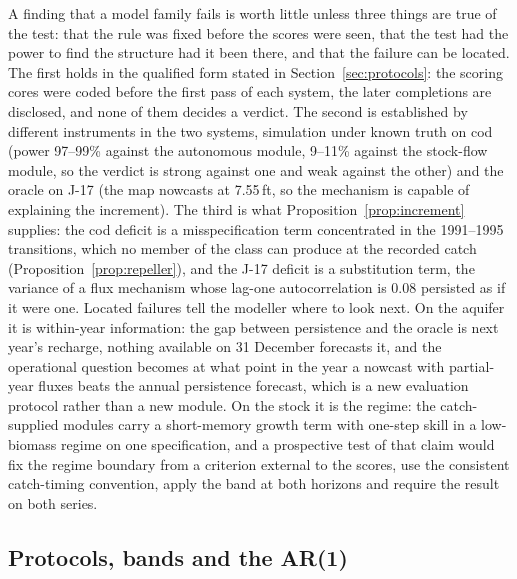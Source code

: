 \documentclass[preprint,11pt,authoryear]{elsarticle}
\theoremstyle{definition}
\theoremstyle{remark}
\begin{document}
A finding that a model family fails is worth little unless three things are true of the test: that the rule was fixed before the scores were seen, that the test had the power to find the structure had it been there, and that the failure can be located. The first holds in the qualified form stated in Section~\ref{sec:protocols}: the scoring cores were coded before the first pass of each system, the later completions are disclosed, and none of them decides a verdict. The second is established by different instruments in the two systems, simulation under known truth on cod (power 97--99\% against the autonomous module, 9--11\% against the stock-flow module, so the verdict is strong against one and weak against the other) and the oracle on J-17 (the map nowcasts at 7.55\,ft, so the mechanism is capable of explaining the increment). The third is what Proposition~\ref{prop:increment} supplies: the cod deficit is a misspecification term concentrated in the 1991--1995 transitions, which no member of the class can produce at the recorded catch (Proposition~\ref{prop:repeller}), and the J-17 deficit is a substitution term, the variance of a flux mechanism whose lag-one autocorrelation is 0.08 persisted as if it were one. Located failures tell the modeller where to look next. On the aquifer it is within-year information: the gap between persistence and the oracle is next year's recharge, nothing available on 31 December forecasts it, and the operational question becomes at what point in the year a nowcast with partial-year fluxes beats the annual persistence forecast, which is a new evaluation protocol rather than a new module. On the stock it is the regime: the catch-supplied modules carry a short-memory growth term with one-step skill in a low-biomass regime on one specification, and a prospective test of that claim would fix the regime boundary from a criterion external to the scores, use the consistent catch-timing convention, apply the band at both horizons and require the result on both series.

\subsection{Protocols, bands and the AR(1)}\label{sec:protocoldiff}
\end{document}
